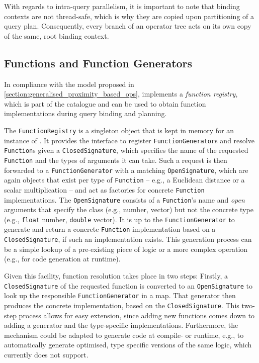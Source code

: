 With regards to intra-query parallelism, it is important to note that binding contexts are not thread-safe, which is why they are copied upon partitioning of a query plan. Consequently, every branch of an operator tree acts on its own copy of the same, root binding context.

\subsection{Functions and Function Generators}

In compliance with the model proposed in \cref{section:generalised_proximity_based_ops}, \cottontail{} implements a \emph{function registry}, which is part of the catalogue and can be used to obtain function implementations during query binding and planning.

The \texttt{FunctionRegistry} is a singleton object that is kept in memory for an instance of \cottontail{}. It provides the interface to register \texttt{FunctionGenerator}s and resolve \texttt{Function}s given a \texttt{ClosedSignature}, which specifies the name of the requested \texttt{Function} and the types of arguments it can take. Such a request is then forwarded to a \texttt{FunctionGenerator} with a matching \texttt{OpenSignature}, which are again objects that exist per type of \texttt{Function} -- e.g., a Euclidean distance or a scalar multiplication -- and act as factories for concrete \texttt{Function} implementations. The \texttt{OpenSignature} consists of a \texttt{Function}'s name and \emph{open} arguments that specify the class (e.g., number, vector) but not the concrete type (e.g., \texttt{float} number, \texttt{double} vector). It is up to the \texttt{FunctionGenerator} to generate and return a concrete \texttt{Function} implementation based on a \texttt{ClosedSignature}, if such an implementation exists. This generation process can be a simple lookup of a pre-existing piece of logic or a more complex operation (e.g., for code generation at runtime).

Given this facility, function resolution takes place in two steps: Firstly, a \texttt{ClosedSignature} of the requested function is converted to an \texttt{OpenSignature} to look up the responsible \texttt{FunctionGenerator} in a map. That generator then produces the concrete implementation, based on the \texttt{ClosedSignature}. This two-step process allows for easy extension, since adding new functions comes down to adding a generator and the type-specific implementations. Furthermore, the mechanism could be adapted to generate code at compile- or runtime, e.g., to automatically generate optimised, type specific versions of the same logic, which \cottontail{} currently does not support.

